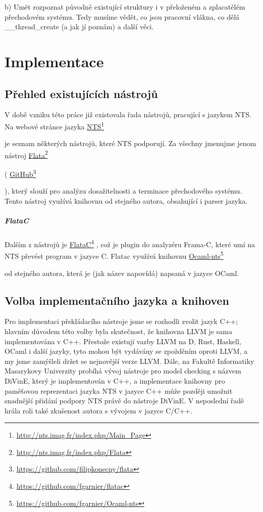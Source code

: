 \documentclass[10pt,a4paper,notitlepage]{report}
\newcommand\fnurl[2]{%
  \href{#2}{#1}\footnote{\url{#2}}%
}
\begin{document}
b) Umět rozpoznat původně existující struktury i v přeloženém a zplacatělém přechodovém systému. Tedy musíme vědět, co jsou pracovní vlákna, co dělá \_\_thread\_create (a jak jí poznám) a další věci.


\chapter{Implementace}

\section{Přehled existujících nástrojů}
V době vzniku této práce již existovala řada nástrojů, pracující s jazykem NTS. Na webové stránce jazyka
\fnurl{NTS}{http://nts.imag.fr/index.php/Main_Page}
je seznam některých nástrojů, které NTS podporují. Za všechny jmenujme jenom nástroj
\fnurl{Flata}{http://nts.imag.fr/index.php/Flata}
(
\fnurl{GitHub}{https://github.com/filipkonecny/flata}
), který slouží pro analýzu dosažitelnosti a terminace přechodového systému. Tento nástroj využívá knihovnu od stejného autora, obsahující i parser jazyka.
\paragraph{FlataC}
Dalším z nástrojů je
\fnurl{FlataC}{https://github.com/fgarnier/flatac},
což je plugin do analyzéru Frama-C, které umí na NTS převést program v jazyce C.
Flatac využívá knihovnu
\fnurl{Ocaml-nts}{https://github.com/fgarnier/Ocaml-nts}
od stejného autora, která je (jak název napovídá) napsaná v jazyce OCaml.

\section{Volba implementačního jazyka a knihoven}
Pro implementaci překládacího nástroje jsme se rozhodli zvolit jazyk C++; hlavním důvodem této volby byla skutečnost, že knihovna LLVM je sama implementována v C++. Přestože existují vazby LLVM na D, Rust, Haskell, OCaml i další jazyky, tyto mohou být vydávány se zpožděním oproti LLVM, a my jsme zamýšleli držet se nejnovější verze LLVM. Dále, na Fakultě Informatiky Masarykovy Univerzity probíhá vývoj nástroje pro model checking s názvem DiVinE, který je implementován v C++, a implementace knihovny pro paměťovou reprezentaci jazyka NTS v jazyce C++ může později umožnit snadnější přidání podpory NTS právě do nástroje DiVinE\cite{BBH+13}. V neposlední řadě hrála roli také zkušenost autora s vývojem v jazyce C/C++.
\end{document}
